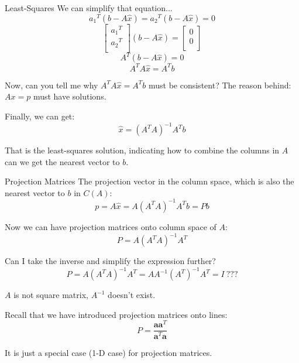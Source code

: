\documentclass{beamer}
\begin{document}
\begin{frame}{Least-Squares}
We can simplify that equation...
    \begin{equation*}
        {a_1}^T\left( b-A\hat{x} \right) ={a_2}^T\left( b-A\hat{x} \right) =0
    \end{equation*}
\begin{equation*}
    \left[ \begin{array}{c}
        {a_1}^T\\
        {a_2}^T\\
    \end{array} \right] \left( b-A\hat{x} \right) =\left[ \begin{array}{c}
        0\\
        0\\
    \end{array} \right]
\end{equation*}
\begin{equation*}
    A^T\left( b-A\hat{x} \right) =0
\end{equation*}
\begin{equation*}
    A^TA\hat{x} =A^Tb
\end{equation*}

Now, can you tell me why $A^TA\hat{x} =A^Tb$ must be consistent? The reason behind: $Ax=p$ must have solutions.

\vspace{3pt}
Finally, we can get:
\begin{equation*}
    \hat{x} =(A^TA)^{-1}A^Tb
\end{equation*}

That is the least-squares solution, indicating how to combine the columns in $A$ can we get the nearest vector to $b$.
\end{frame}

\begin{frame}{Projection Matrices}
The projection vector in the column space, which is also the nearest vector to $b$ in $C(A)$:
\begin{equation*}
    p=A\hat{x}=A\left( A^TA \right) ^{-1}A^Tb=Pb
\end{equation*}

Now we can have projection matrices onto column space of $A$:
\begin{equation*}
    P=A\left( A^TA \right) ^{-1}A^T
\end{equation*}

Can I take the inverse and simplify the expression further?
\begin{equation*}
    P=A\left( A^TA \right) ^{-1}A^T=AA^{-1}(A^T)^{-1}A^T=I\:???
\end{equation*}

$A$ is not square matrix, $A^{-1}$ doesn't exist.

\vspace{3pt}
Recall that we have introduced projection matrices onto lines:
\begin{equation*}
    P=\frac{\mathbf{aa}^T}{\mathbf{a}^T\mathbf{a}}
\end{equation*}

It is just a special case (1-D case) for projection matrices.
\end{frame}
\end{document}

